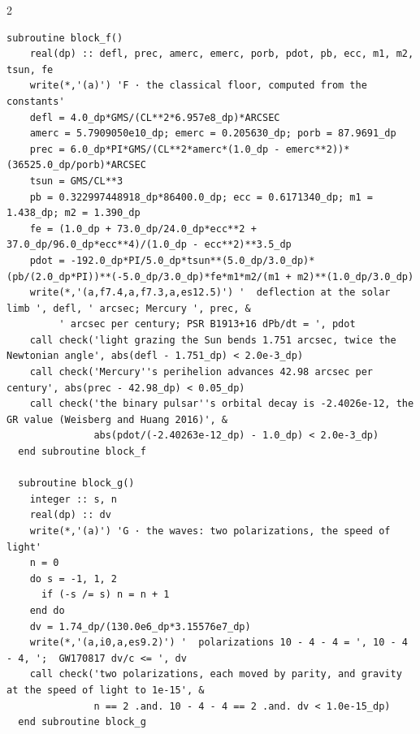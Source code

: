 \documentclass[10pt]{article}
\begin{document}
\begin{multicols}{2}
\begin{Verbatim}[fontsize=\fontsize{5.9}{6.8}\selectfont,breaklines,breakanywhere,breaksymbolleft={}]
  subroutine block_f()
    real(dp) :: defl, prec, amerc, emerc, porb, pdot, pb, ecc, m1, m2, tsun, fe
    write(*,'(a)') 'F · the classical floor, computed from the constants'
    defl = 4.0_dp*GMS/(CL**2*6.957e8_dp)*ARCSEC
    amerc = 5.7909050e10_dp; emerc = 0.205630_dp; porb = 87.9691_dp
    prec = 6.0_dp*PI*GMS/(CL**2*amerc*(1.0_dp - emerc**2))*(36525.0_dp/porb)*ARCSEC
    tsun = GMS/CL**3
    pb = 0.322997448918_dp*86400.0_dp; ecc = 0.6171340_dp; m1 = 1.438_dp; m2 = 1.390_dp
    fe = (1.0_dp + 73.0_dp/24.0_dp*ecc**2 + 37.0_dp/96.0_dp*ecc**4)/(1.0_dp - ecc**2)**3.5_dp
    pdot = -192.0_dp*PI/5.0_dp*tsun**(5.0_dp/3.0_dp)*(pb/(2.0_dp*PI))**(-5.0_dp/3.0_dp)*fe*m1*m2/(m1 + m2)**(1.0_dp/3.0_dp)
    write(*,'(a,f7.4,a,f7.3,a,es12.5)') '  deflection at the solar limb ', defl, ' arcsec; Mercury ', prec, &
         ' arcsec per century; PSR B1913+16 dPb/dt = ', pdot
    call check('light grazing the Sun bends 1.751 arcsec, twice the Newtonian angle', abs(defl - 1.751_dp) < 2.0e-3_dp)
    call check('Mercury''s perihelion advances 42.98 arcsec per century', abs(prec - 42.98_dp) < 0.05_dp)
    call check('the binary pulsar''s orbital decay is -2.4026e-12, the GR value (Weisberg and Huang 2016)', &
               abs(pdot/(-2.40263e-12_dp) - 1.0_dp) < 2.0e-3_dp)
  end subroutine block_f

  subroutine block_g()
    integer :: s, n
    real(dp) :: dv
    write(*,'(a)') 'G · the waves: two polarizations, the speed of light'
    n = 0
    do s = -1, 1, 2
      if (-s /= s) n = n + 1
    end do
    dv = 1.74_dp/(130.0e6_dp*3.15576e7_dp)
    write(*,'(a,i0,a,es9.2)') '  polarizations 10 - 4 - 4 = ', 10 - 4 - 4, ';  GW170817 dv/c <= ', dv
    call check('two polarizations, each moved by parity, and gravity at the speed of light to 1e-15', &
               n == 2 .and. 10 - 4 - 4 == 2 .and. dv < 1.0e-15_dp)
  end subroutine block_g


\end{Verbatim}
\end{multicols}
\end{document}
